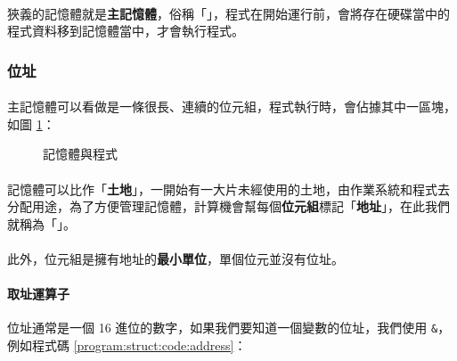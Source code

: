 \documentclass[12pt,a4paper,oneside]{article}
\begin{document}
\begin{CJK}{UTF8}{bkai}
\paragraph{}狹義的記憶體就是\textbf{主記憶體}，俗稱「」，程式在開始運行前，會將存在硬碟當中的程式資料移到記憶體當中，才會執行程式。

\subsubsection{位址}

\paragraph{}主記憶體可以看做是一條很長、連續的位元組，程式執行時，會佔據其中一區塊，如圖 \ref{program:struct:fig:memory:and:program}：

\begin{figure}[h!]
\centering
{}
\caption{記憶體與程式}
\label{program:struct:fig:memory:and:program}
\end{figure}

\paragraph{}記憶體可以比作「\textbf{土地}」，一開始有一大片未經使用的土地，由作業系統和程式去分配用途，為了方便管理記憶體，計算機會幫每個{\color{blue}\textbf{位元組}}標記「\textbf{地址}」，在此我們就稱為「」。
\paragraph{}此外，位元組是擁有地址的{\color{blue}\textbf{最小單位}}，單個位元並沒有位址。

\paragraph{取址運算子}位址通常是一個 16 進位的數字，如果我們要知道一個變數的位址，我們使用 \lstinline!&!，例如程式碼 \ref{program:struct:code:address}：


\end{CJK}
\end{document}
